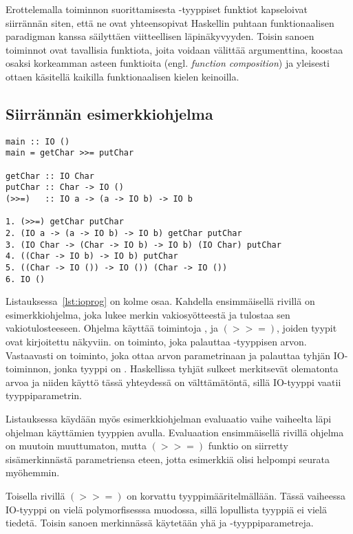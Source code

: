 \documentclass[finnish]{tktltiki2}
\begin{document}
Erottelemalla toiminnon suorittamisesta -tyyppiset funktiot kapseloivat siirrännän siten,
että ne ovat yhteensopivat Haskellin puhtaan funktionaalisen paradigman kanssa säilyttäen
viitteellisen läpinäkyvyyden. Toisin sanoen toiminnot ovat tavallisia funktiota, joita voidaan
välittää argumenttina, koostaa osaksi korkeamman asteen funktioita (engl. \emph{function
composition}) ja yleisesti ottaen käsitellä kaikilla funktionaalisen kielen keinoilla.

\subsection{Siirrännän esimerkkiohjelma}

\begin{lstlisting}[float,label={lst:ioprog},caption={IO-ohjelma ja sen evaluaatio}]
main :: IO ()
main = getChar >>= putChar

getChar :: IO Char
putChar :: Char -> IO ()
(>>=)   :: IO a -> (a -> IO b) -> IO b

1. (>>=) getChar putChar
2. (IO a -> (a -> IO b) -> IO b) getChar putChar
3. (IO Char -> (Char -> IO b) -> IO b) (IO Char) putChar
4. ((Char -> IO b) -> IO b) putChar
5. ((Char -> IO ()) -> IO ()) (Char -> IO ())
6. IO ()
\end{lstlisting}

Listauksessa~\ref{lst:ioprog} on kolme osaa. Kahdella ensimmäisellä rivillä on esimerkkiohjelma,
joka lukee merkin vakiosyötteestä ja tulostaa sen vakiotulosteeseen. Ohjelma käyttää toimintoja
,  ja $(>>=)$, joiden tyypit ovat kirjoitettu näkyviin. 
on toiminto, joka palauttaa -tyyppisen arvon. Vastaavasti  on toiminto,
joka ottaa  arvon parametrinaan ja palauttaa tyhjän IO-toiminnon, jonka tyyppi on
. Haskellissa tyhjät sulkeet merkitsevät olematonta arvoa ja niiden käyttö tässä
yhteydessä on välttämätöntä, sillä IO-tyyppi vaatii tyyppiparametrin.

Listauksessa käydään myös esimerkkiohjelman evaluaatio vaihe vaiheelta läpi ohjelman käyttämien
tyyppien avulla. Evaluaation ensimmäisellä rivillä ohjelma on muutoin muuttumaton, mutta $(>>=)$
funktio on siirretty sisämerkinnästä parametriensa eteen, jotta esimerkkiä olisi helpompi seurata
myöhemmin.

Toisella rivillä $(>>=)$ on korvattu tyyppimääritelmällään. Tässä vaiheessa IO-tyyppi on vielä
polymorfisesssa muodossa, sillä lopullista tyyppiä ei vielä tiedetä. Toisin sanoen merkinnässä
käytetään yhä  ja  -tyyppiparametreja.
\end{document}
